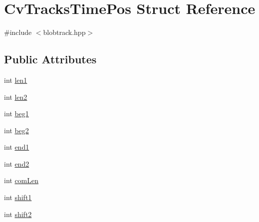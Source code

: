 \hypertarget{structCvTracksTimePos}{\section{Cv\-Tracks\-Time\-Pos Struct Reference}
\label{structCvTracksTimePos}
}


{\ttfamily \#include $<$blobtrack.\-hpp$>$}

\subsection*{Public Attributes}
\begin{DoxyCompactItemize}
\item 
int \hyperlink{structCvTracksTimePos_a6ae05fd391a05a53fe785a8072f239c7}{len1}
\item 
int \hyperlink{structCvTracksTimePos_a708bc6dc6fda0a94aed47036397c4682}{len2}
\item 
int \hyperlink{structCvTracksTimePos_ac95c2682d4b689af2cb34649bcc1b475}{beg1}
\item 
int \hyperlink{structCvTracksTimePos_ac967f1871c42d81586d9a59a0e8f180b}{beg2}
\item 
int \hyperlink{structCvTracksTimePos_a7f9f16e3b42c07eb7951b07035e4921b}{end1}
\item 
int \hyperlink{structCvTracksTimePos_a058e96989fadd97bb4106c5fc9aee0b1}{end2}
\item 
int \hyperlink{structCvTracksTimePos_a485a42c9ec1b7f0b8c85e7a1705ddf82}{com\-Len}
\item 
int \hyperlink{structCvTracksTimePos_a50b14244f417ba5edbd15ea9ded3f235}{shift1}
\item 
int \hyperlink{structCvTracksTimePos_a5a59ec738551f7b8f56831b972a8f65c}{shift2}
\end{DoxyCompactItemize}



